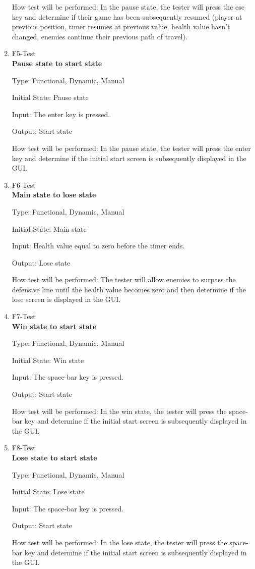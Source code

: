 \documentclass[12pt, titlepage]{article}
\begin{document}
\begin{enumerate}
How test will be performed: In the pause state, the tester will press the esc key and determine if their game has been subsequently resumed (player at previous position, timer resumes at previous value, health value hasn't changed, enemies continue their previous path of travel).

\item{F5-Test} \\
\textbf{Pause state to start state}

Type: Functional, Dynamic, Manual
					
Initial State: Pause state
					
Input: The enter key is pressed.
					
Output: Start state
					
How test will be performed: In the pause state, the tester will press the enter key and determine if the initial start screen is subsequently displayed in the GUI.

\item{F6-Test} \\
\textbf{Main state to lose state}

Type: Functional, Dynamic, Manual
					
Initial State: Main state
					
Input: Health value equal to zero before the timer ends.
					
Output: Lose state
					
How test will be performed: The tester will allow enemies to surpass the defensive line until the health value becomes zero and then determine if the lose screen is displayed in the GUI.

\item{F7-Test} \\
\textbf{Win state to start state}

Type: Functional, Dynamic, Manual
					
Initial State: Win state
					
Input: The space-bar key is pressed.
					
Output: Start state
					
How test will be performed: In the win state, the tester will press the space-bar key and determine if the initial start screen is subsequently displayed in the GUI.

\item{F8-Test} \\
\textbf{Lose state to start state}

Type: Functional, Dynamic, Manual
					
Initial State: Lose state
					
Input: The space-bar key is pressed.
					
Output: Start state
					
How test will be performed: In the lose state, the tester will press the space-bar key and determine if the initial start screen is subsequently displayed in the GUI.

\end{enumerate}
\end{document}
